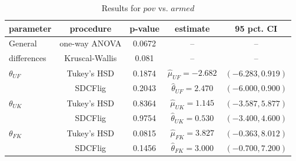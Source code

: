 \begin{table}[h]
    \centering
    \begin{tabular}{|l|c|c|c|c|}
        \hline
        \textbf{parameter} & \textbf{procedure} & \textbf{p-value} & \textbf{estimate} & \textbf{95 pct. CI}\\
        \hline
        General & one-way ANOVA & 0.0672 & -- & --\\
        differences & Kruscal-Wallis & 0.081 & -- & --\\
        \hline
        $\theta_{UF}$ & Tukey's HSD & 0.1874 & $\hat{\mu}_{UF} = -2.682$ & $(-6.283, 0.919)$\\
        & SDCFlig & 0.2043 & $\hat{\theta}_{UF} = 2.470$ & $(-6.000, 0.900)$\\
        \hline
        $\theta_{UK}$ & Tukey's HSD & 0.8364 & $\hat{\mu}_{UK} = 1.145$ & $(-3.587, 5.877)$\\
        & SDCFlig & 0.9754 & $\hat{\theta}_{UK} = 0.530$ & $(-3.400, 4.600)$\\
        \hline
        $\theta_{FK}$ & Tukey's HSD & 0.0815 & $\hat{\mu}_{FK} = 3.827$ & $(-0.363, 8.012)$\\
        & SDCFlig & 0.1456 & $\hat{\theta}_{FK} = 3.000$ & $(-0.700, 7.200)$\\
        \hline
    \end{tabular}
    \caption{Results for $pov$ vs. $armed$}
    \label{tab:aov4_results}
\end{table}